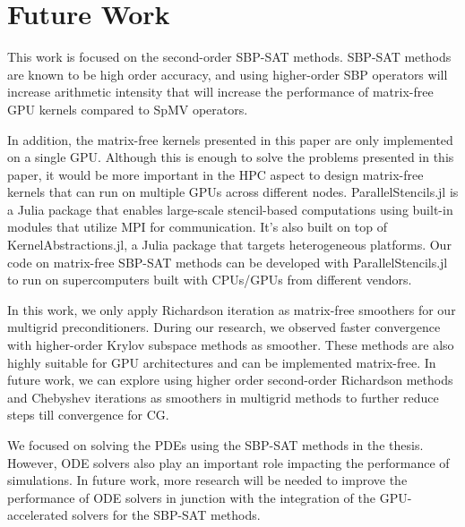 \section{Future Work}
This work is focused on the second-order SBP-SAT methods. SBP-SAT methods are known to be high order accuracy, and using higher-order SBP operators will increase arithmetic intensity that will increase the performance of matrix-free GPU kernels compared to SpMV operators.

In addition, the matrix-free kernels presented in this paper are only implemented on a single GPU. 
Although this is enough to solve the problems presented in this paper, it would be more important in the HPC aspect to design matrix-free kernels that can run on multiple GPUs across different nodes.
ParallelStencils.jl is a Julia package that enables large-scale stencil-based computations using built-in modules that utilize MPI for communication.
It's also built on top of KernelAbstractions.jl, a Julia package that targets heterogeneous platforms.
Our code on matrix-free SBP-SAT methods can be developed with ParallelStencils.jl to run on supercomputers built with CPUs/GPUs from different vendors.

In this work, we only apply Richardson iteration as matrix-free smoothers for our multigrid preconditioners. During our research, we observed faster convergence with higher-order Krylov subspace methods as smoother. These methods are also highly suitable for GPU architectures and can be implemented matrix-free.
In future work, we can explore using higher order second-order Richardson methods and Chebyshev iterations as smoothers in multigrid methods to further reduce steps till convergence for CG.

We focused on solving the PDEs using the SBP-SAT methods in the thesis. However, ODE solvers also play an important role impacting the performance of simulations. In future work, more research will be needed to improve the performance of ODE solvers in junction with the integration of the GPU-accelerated solvers for the SBP-SAT methods.